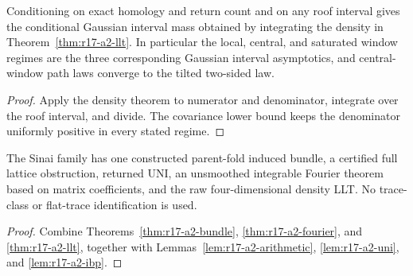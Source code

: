 \begin{corollary}
\label{cor:r17-a2-conditioning}
Conditioning on exact homology and return count and on any roof interval gives
the conditional Gaussian interval mass obtained by integrating the density in
Theorem~\ref{thm:r17-a2-llt}.  In particular the local, central, and saturated
window regimes are the three corresponding Gaussian interval asymptotics,
and central-window path laws converge to the tilted two-sided law.
\end{corollary}

\begin{proof}
Apply the density theorem to numerator and denominator, integrate over the
roof interval, and divide.  The covariance lower bound keeps the denominator
uniformly positive in every stated regime.
\end{proof}

\begin{theorem}
\label{thm:r17-a2-main}
The Sinai family has one constructed parent-fold induced bundle, a certified
full lattice obstruction, returned UNI, an unsmoothed integrable Fourier
theorem based on matrix coefficients, and the raw four-dimensional density
LLT.  No trace-class or flat-trace identification is used.
\end{theorem}

\begin{proof}
Combine Theorems~\ref{thm:r17-a2-bundle},
\ref{thm:r17-a2-fourier}, and \ref{thm:r17-a2-llt}, together with
Lemmas~\ref{lem:r17-a2-arithmetic}, \ref{lem:r17-a2-uni}, and
\ref{lem:r17-a2-ibp}.
\end{proof}
